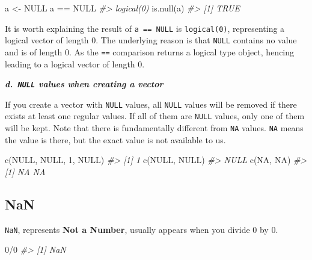 \documentclass[
]{book}
\newenvironment{Shaded}{\begin{snugshade}}{\end{snugshade}}
\newcommand{\CommentTok}[1]{\textcolor[rgb]{0.56,0.35,0.01}{\textit{#1}}}
\newcommand{\ConstantTok}[1]{\textcolor[rgb]{0.00,0.00,0.00}{#1}}
\newcommand{\DecValTok}[1]{\textcolor[rgb]{0.00,0.00,0.81}{#1}}
\newcommand{\FunctionTok}[1]{\textcolor[rgb]{0.00,0.00,0.00}{#1}}
\newcommand{\NormalTok}[1]{#1}
\newcommand{\OtherTok}[1]{\textcolor[rgb]{0.56,0.35,0.01}{#1}}
\newcommand{\SpecialCharTok}[1]{\textcolor[rgb]{0.00,0.00,0.00}{#1}}
\begin{document}
\begin{Shaded}
\begin{Highlighting}[]
\NormalTok{a }\OtherTok{\textless{}{-}} \ConstantTok{NULL}
\NormalTok{a }\SpecialCharTok{==} \ConstantTok{NULL}      
\CommentTok{\#\textgreater{} logical(0)}
\FunctionTok{is.null}\NormalTok{(a)}
\CommentTok{\#\textgreater{} [1] TRUE}
\end{Highlighting}
\end{Shaded}

It is worth explaining the result of \texttt{a\ ==\ NULL} is \texttt{logical(0)}, representing a logical vector of length 0. The underlying reason is that \texttt{NULL} contains no value and is of length 0. As the \texttt{==} comparison returns a logical type object, hencing leading to a logical vector of length 0.

\textbf{\emph{d.~\texttt{NULL} values when creating a vector}}

If you create a vector with \texttt{NULL} values, all \texttt{NULL} values will be removed if there exists at least one regular values. If all of them are \texttt{NULL} values, only one of them will be kept. Note that there is fundamentally different from \texttt{NA} values. \texttt{NA} means the value is there, but the exact value is not available to us.

\begin{Shaded}
\begin{Highlighting}[]
\FunctionTok{c}\NormalTok{(}\ConstantTok{NULL}\NormalTok{, }\ConstantTok{NULL}\NormalTok{, }\DecValTok{1}\NormalTok{, }\ConstantTok{NULL}\NormalTok{)}
\CommentTok{\#\textgreater{} [1] 1}
\FunctionTok{c}\NormalTok{(}\ConstantTok{NULL}\NormalTok{, }\ConstantTok{NULL}\NormalTok{)}
\CommentTok{\#\textgreater{} NULL}
\FunctionTok{c}\NormalTok{(}\ConstantTok{NA}\NormalTok{, }\ConstantTok{NA}\NormalTok{)}
\CommentTok{\#\textgreater{} [1] NA NA}
\end{Highlighting}
\end{Shaded}

\hypertarget{NaN}{%
\subsection{NaN}\label{NaN}}

\texttt{NaN}, represents \textbf{Not a Number}, usually appears when you divide 0 by 0.

\begin{Shaded}
\begin{Highlighting}[]
\DecValTok{0}\SpecialCharTok{/}\DecValTok{0}
\CommentTok{\#\textgreater{} [1] NaN}
\end{Highlighting}
\end{Shaded}
\end{document}
